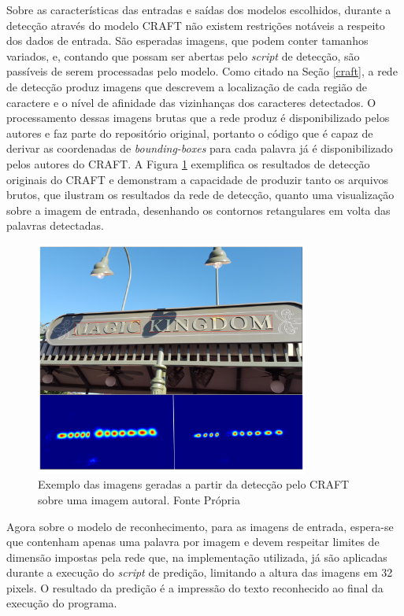 Sobre as características das entradas e saídas dos modelos escolhidos, durante a detecção através do modelo CRAFT não existem restrições notáveis a respeito dos dados de entrada. São esperadas imagens, que podem conter tamanhos variados, e, contando que possam ser abertas pelo \textit{script} de detecção, são passíveis de serem processadas pelo modelo. Como citado na Seção \ref{craft}, a rede de detecção produz imagens que descrevem a localização de cada região de caractere e o nível de afinidade das vizinhanças dos caracteres detectados. O processamento dessas imagens brutas que a rede produz é disponibilizado pelos autores e faz parte do repositório original, portanto o código que é capaz de derivar as coordenadas de \textit{bounding-boxes} para cada palavra já é disponibilizado pelos autores do CRAFT. A Figura \ref{fig:methodology_craft_example} exemplifica os resultados de detecção originais do CRAFT e demonstram a capacidade de produzir tanto os arquivos brutos, que ilustram os resultados da rede de detecção, quanto uma visualização sobre a imagem de entrada, desenhando os contornos retangulares em volta das palavras detectadas.

\begin{figure}
    \centering
    \includegraphics[width=0.8\textwidth]{figs/craft-exmaple.png}
    \caption{Exemplo das imagens geradas a partir da detecção pelo CRAFT sobre uma imagem autoral. Fonte Própria}
    \label{fig:methodology_craft_example}
\end{figure}

Agora sobre o modelo de reconhecimento, para as imagens de entrada, espera-se que contenham apenas uma palavra por imagem e devem respeitar limites de dimensão impostas pela rede que, na implementação utilizada, já são aplicadas durante a execução do \textit{script} de predição, limitando a altura das imagens em 32 pixels. O resultado da predição é a impressão do texto reconhecido ao final da execução do programa. 


